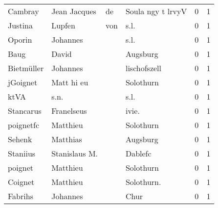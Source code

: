 \begin{center}
\begin{tiny}
\begin{longtabu}{llllrr}
                  Cambray &                       Jean Jacques &          de &                           Soula ngy t lrvyV &          0 &         1 \\
                  Justina &                             Lupfen &         von &                                        s.l. &          0 &         1 \\
                   Oporin &                           Johannes &             &                                        s.l. &          0 &         1 \\
                     Baug &                              David &             &                                    Augsburg &          0 &         1 \\
               Bietmüller &                           Johannes &             &                                lischofszell &          0 &         1 \\
                 jGoignet &                         Matt hi eu &             &                                   Solothurn &          0 &         1 \\
                     ktVA &                               s.n. &             &                                        s.l. &          0 &         1 \\
                Stancarus &                         Franelseus &             &                                      ivie.  &          0 &         1 \\
                poignetfc &                           Matthieu &             &                                   Solothurn &          0 &         1 \\
                   Sehenk &                           Matthias &             &                                    Augsburg &          0 &         1 \\
                 Staniius &                      Stanislaus M. &             &                                     Dablefc &          0 &         1 \\
                  poignet &                           Matthieu &             &                                   Solothurn &          0 &         1 \\
                  Coignet &                           Matthieu &             &                                 Solothurn.  &          0 &         1 \\
                  Fabrihs &                           Johannes &             &                                        Chur &          0 &         1 \\

\end{longtabu}
\end{tiny}
\end{center}
